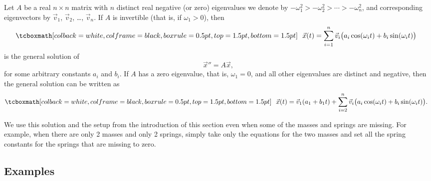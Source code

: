 \begin{theorem}
Let $A$ be a real $n \times n$ matrix
with $n$ distinct real negative (or zero) eigenvalues we
denote by $-\omega_1^2 > -\omega_2^2 > \cdots > -\omega_n^2$, and
corresponding
eigenvectors by
$\vec{v}_1$, $\vec{v}_2$, \ldots, $\vec{v}_n$.  If $A$ is invertible
(that is, if $\omega_1 > 0$), then
\begin{equation*}
\mybxbg{~~
\vec{x}(t)
= \sum_{i=1}^n \vec{v}_i \bigl(a_i \cos (\omega_i t) + b_i \sin (\omega_i t) \bigr) 
~~}
\end{equation*}
is the general solution of
\begin{equation*}
{\vec{x}}'' = A \vec{x},
\end{equation*}
for some arbitrary constants $a_i$ and $b_i$.
If $A$ has a zero eigenvalue, that is, $\omega_1 = 0$,
and all other eigenvalues are distinct and
negative, then the general solution can be written as
\begin{equation*}
\mybxbg{~~
\vec{x}(t) = \vec{v}_1 (a_1 + b_1 t) +
\sum_{i=2}^n \vec{v}_i \bigl(a_i \cos (\omega_i t) + b_i \sin (\omega_i t) \bigr) .
~~}
\end{equation*}
\end{theorem}

We use this solution and the setup from the introduction
of this section even when some of the masses and springs are missing.  
For example, when there are only 2 masses and only 2 springs, simply take
only the equations for
the two masses and set all the spring constants for the springs that
are missing to zero.

\subsection{Examples}

